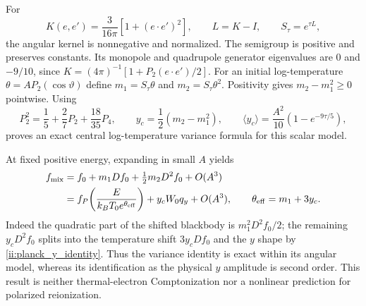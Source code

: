 For
\begin{equation}
 K(e,e')=\frac3{16\pi}[1+(e\cdot e')^2],\qquad
 L=K-I,\qquad S_\tau=e^{\tau L},
 \label{ii:scalar_thomson}
\end{equation}
the angular kernel is nonnegative and normalized. The semigroup is positive and preserves constants. Its monopole and quadrupole generator eigenvalues are $0$ and $-9/10$, since
$K=(4\pi)^{-1}[1+P_2(e\cdot e')/2]$. For an initial log-temperature $\theta=AP_2(\cos\vartheta)$ define $m_1=S_\tau\theta$ and $m_2=S_\tau\theta^2$. Positivity gives $m_2-m_1^2\ge0$ pointwise. Using
\begin{equation}
 P_2^2=\frac15+\frac27P_2+\frac{18}{35}P_4,
 \qquad
 y_c=\frac12(m_2-m_1^2),\qquad
 \langle y_c\rangle=\frac{A^2}{10}(1-e^{-9\tau/5}),
 \label{ii:scalar_mixing_variance}
\end{equation}
proves an exact central log-temperature variance formula for this scalar model.

At fixed positive energy, expanding in small $A$ yields
\begin{align}
 f_{\rm mix}&=f_0+m_1Df_0+\tfrac12m_2D^2f_0+O(A^3)\nonumber\\
 &=f_P\!\left(\frac{E}{k_BT_0e^{\theta_{\rm eff}}}\right)
       +y_cW_0q_y+O(A^3),\qquad
 \theta_{\rm eff}=m_1+3y_c.
 \label{ii:scalar_mixing_spectrum}
\end{align}
Indeed the quadratic part of the shifted blackbody is $m_1^2D^2f_0/2$; the remaining $y_cD^2f_0$ splits into the temperature shift $3y_cDf_0$ and the $y$ shape by \eqref{ii:planck_y_identity}. Thus the variance identity is exact within its angular model, whereas its identification as the physical $y$ amplitude is second order. This result is neither thermal-electron Comptonization nor a nonlinear prediction for polarized reionization.

